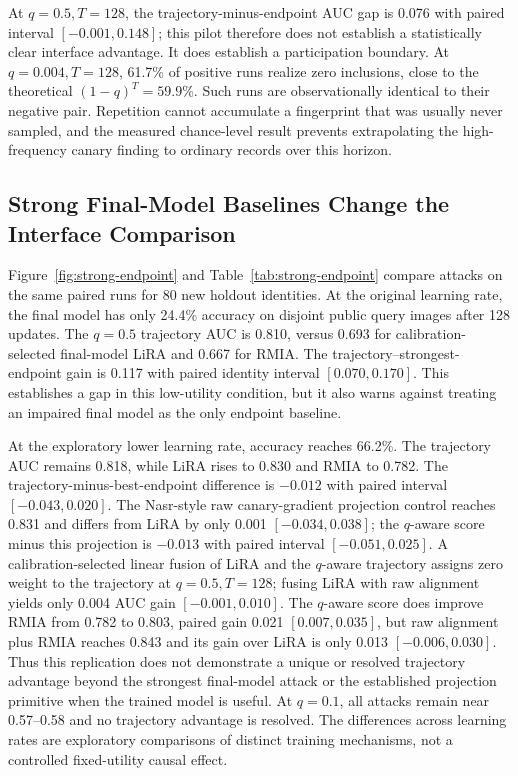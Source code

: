 \documentclass[conference]{IEEEtran}
\begin{document}
At $q=0.5,T=128$, the trajectory-minus-endpoint AUC gap is 0.076 with paired interval $[-0.001,0.148]$; this pilot therefore does not establish a statistically clear interface advantage. It does establish a participation boundary. At $q=0.004,T=128$, 61.7\% of positive runs realize zero inclusions, close to the theoretical $(1-q)^T=59.9\%$. Such runs are observationally identical to their negative pair. Repetition cannot accumulate a fingerprint that was usually never sampled, and the measured chance-level result prevents extrapolating the high-frequency canary finding to ordinary records over this horizon.

\subsection{Strong Final-Model Baselines Change the Interface Comparison}

Figure~\ref{fig:strong-endpoint} and Table~\ref{tab:strong-endpoint} compare attacks on the same paired runs for 80 new holdout identities. At the original learning rate, the final model has only 24.4\% accuracy on disjoint public query images after 128 updates. The $q=0.5$ trajectory AUC is 0.810, versus 0.693 for calibration-selected final-model LiRA and 0.667 for RMIA. The trajectory--strongest-endpoint gain is 0.117 with paired identity interval $[0.070,0.170]$. This establishes a gap in this low-utility condition, but it also warns against treating an impaired final model as the only endpoint baseline.

At the exploratory lower learning rate, accuracy reaches 66.2\%. The trajectory AUC remains 0.818, while LiRA rises to 0.830 and RMIA to 0.782. The trajectory-minus-best-endpoint difference is $-0.012$ with paired interval $[-0.043,0.020]$. The Nasr-style raw canary-gradient projection control reaches 0.831 and differs from LiRA by only 0.001 $[-0.034,0.038]$; the $q$-aware score minus this projection is $-0.013$ with paired interval $[-0.051,0.025]$. A calibration-selected linear fusion of LiRA and the $q$-aware trajectory assigns zero weight to the trajectory at $q=0.5,T=128$; fusing LiRA with raw alignment yields only 0.004 AUC gain $[-0.001,0.010]$. The $q$-aware score does improve RMIA from 0.782 to 0.803, paired gain 0.021 $[0.007,0.035]$, but raw alignment plus RMIA reaches 0.843 and its gain over LiRA is only 0.013 $[-0.006,0.030]$. Thus this replication does not demonstrate a unique or resolved trajectory advantage beyond the strongest final-model attack or the established projection primitive when the trained model is useful. At $q=0.1$, all attacks remain near 0.57--0.58 and no trajectory advantage is resolved. The differences across learning rates are exploratory comparisons of distinct training mechanisms, not a controlled fixed-utility causal effect.
\end{document}
